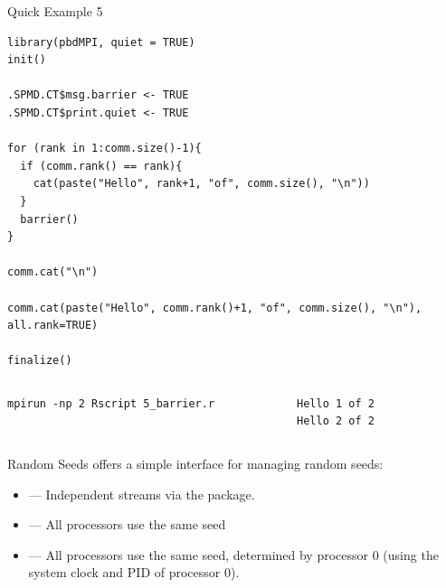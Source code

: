 \begin{frame}
  \begin{exampleblock}{Quick Example 5}
\begin{lstlisting}[title=Barrier: 5\_barrier.r]
library(pbdMPI, quiet = TRUE)
init()

.SPMD.CT$msg.barrier <- TRUE
.SPMD.CT$print.quiet <- TRUE

for (rank in 1:comm.size()-1){
  if (comm.rank() == rank){
    cat(paste("Hello", rank+1, "of", comm.size(), "\n"))
  }
  barrier()
}

comm.cat("\n")

comm.cat(paste("Hello", comm.rank()+1, "of", comm.size(), "\n"), all.rank=TRUE)

finalize()
\end{lstlisting}
  \begin{columns}[t,onlytextwidth]
    \begin{column}{0.58\textwidth}
\begin{lstlisting}[backgroundcolor=\color{white},keywordstyle=\color{black},title=Execute this script via:]
mpirun -np 2 Rscript 5_barrier.r
\end{lstlisting}
    \end{column}
    \hfill
    \begin{column}{0.4\textwidth}
\begin{lstlisting}[title=Sample Output:]
Hello 1 of 2 
Hello 2 of 2 
\end{lstlisting}
    \end{column}
​  \end{columns}
  \end{exampleblock}
\end{frame}


\begin{frame}
  \begin{block}{Random Seeds}\pause
   offers a simple interface for managing random seeds:
    \begin{itemize}
      \item {} --- Independent streams via the  package.
      \item {} --- All processors use the same seed 
      \item {} --- All processors use the same seed, determined by processor 0 (using the system clock and PID of processor 0).
    \end{itemize}
  \end{block}
\end{frame}



